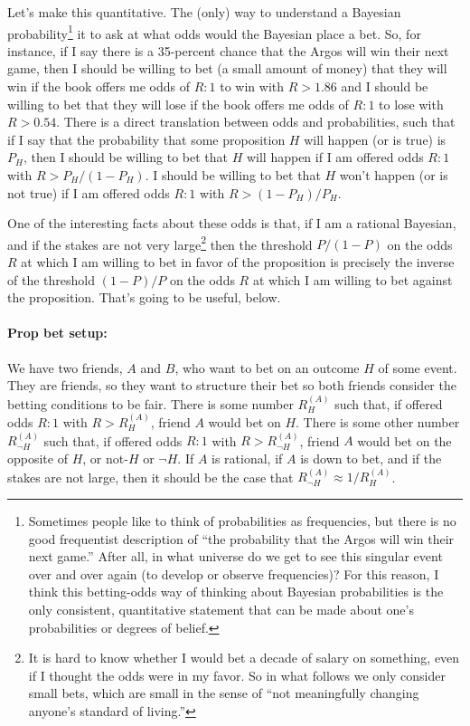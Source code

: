 \documentclass{article}
\renewcommand{\not}{\neg}
\begin{document}
Let's make this quantitative.
The (only) way to understand a Bayesian probability\footnote{%
Sometimes people like to think of probabilities as frequencies, but there is no good frequentist description
of ``the probability that the Argos will win their next game.''
After all, in what universe do we get to see this singular event over and over again (to develop or observe frequencies)?
For this reason, I think this betting-odds way of thinking about Bayesian probabilities is the only consistent,
quantitative statement that can be made about one's probabilities or degrees of belief.}
it to ask at what odds would the Bayesian place a bet.
So, for instance, if I say there is a 35-percent chance that the Argos will win their next game,
then I should be willing to bet (a small amount of money) that they will win if the book offers me odds
of $R:1$ to win with $R>1.86$
and I should be willing to bet that they will lose if the book offers
me odds of $R:1$ to lose with $R>0.54$.
There is a direct translation between odds and probabilities, such that if I say that the probability
that some proposition $H$ will happen (or is true) is $P_H$, then I should be willing to bet that $H$
will happen if I am offered odds $R:1$ with $R>P_H/(1 - P_H)$.
I should be willing to bet that $H$ won't happen (or is not true) if I am offered odds $R:1$ with $R>(1-P_H)/P_H$.

One of the interesting facts about these odds is that, if I am a rational Bayesian,
and if the stakes are not very large\footnote{%
It is hard to know whether I would bet a decade of salary on something, even if I thought the odds were in my favor.
So in what follows we only consider small bets, which are small in the sense of ``not meaningfully changing anyone's standard of living.''}
then the threshold $P/(1-P)$ on the odds $R$ at which I am willing to bet in favor of the proposition is
precisely the inverse of the threshold $(1-P)/P$ on the odds $R$ at which I am willing to bet against the proposition.
That's going to be useful, below.

\paragraph{Prop bet setup:}
We have two friends, $A$ and $B$, who want to bet on an outcome $H$ of some event.
They are friends, so they want to structure their bet so both friends consider the betting conditions to be fair.
There is some number $R_H^{(A)}$ such that, if offered odds $R:1$ with $R>R_H^{(A)}$, friend $A$ would bet on $H$.
There is some other number $R_{\not H}^{(A)}$ such that, if offered odds $R:1$ with $R>R_{\not H}^{(A)}$, friend $A$
would bet on the opposite of $H$, or not-$H$ or $\not H$.
If $A$ is rational, if $A$ is down to bet, and if the stakes are not large, then it should be the case that
$R_{\not H}^{(A)} \approx 1/R_H^{(A)}$.
\end{document}
